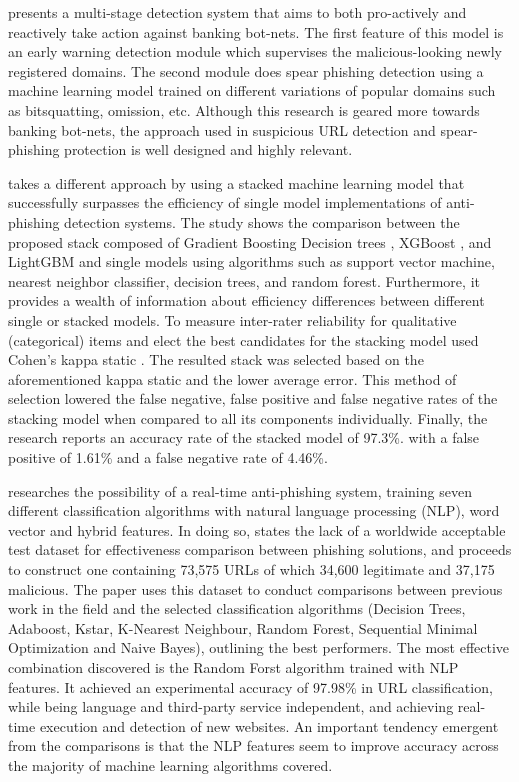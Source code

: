 \cite{MULTISTAGED_DETECTION_BOTNETS} presents a multi-stage detection system that aims to both pro-actively and reactively take action against banking bot-nets. The first feature of this model is an early warning detection module which supervises the malicious-looking newly registered domains. The second module does spear phishing detection using a machine learning model trained on different variations of popular domains such as bitsquatting, omission, etc. Although this research is geared more towards banking bot-nets, the approach used in suspicious URL detection and spear-phishing protection is well designed and highly relevant.

\cite{STACKED_ML_URL_HTML} takes a different approach by using a stacked machine learning model that successfully surpasses the efficiency of single model implementations of anti-phishing detection systems. The study shows the comparison between the proposed stack composed of Gradient Boosting Decision trees \citep{GBDT}, XGBoost \citep{XGBOOST}, and LightGBM \citep{LIGHTGBM} and single models using algorithms such as support vector machine, nearest neighbor classifier, decision trees, and random forest. Furthermore, it provides a wealth of information about efficiency differences between different single or stacked models. To measure inter-rater reliability for qualitative (categorical) items and elect the best candidates for the stacking model \cite{STACKED_ML_URL_HTML} used Cohen's kappa static \citep{DATA_MINING_T&T}. The resulted stack was selected based on the aforementioned kappa static and the lower average error. This method of selection lowered the false negative, false positive and false negative rates of the stacking model when compared to all its components individually. Finally, the research reports an accuracy rate of the stacked model of 97.3\%. with a false positive of 1.61\% and a false negative rate of 4.46\%.

\cite{ML_BASED_DETECTION_FROM_URL} researches the possibility of a real-time anti-phishing system, training seven different classification algorithms with natural language processing (NLP), word vector and hybrid features. In doing so, \cite{ML_BASED_DETECTION_FROM_URL} states the lack of a worldwide acceptable test dataset for effectiveness comparison between phishing solutions, and proceeds to construct one containing 73,575 URLs of which 34,600 legitimate and 37,175 malicious. The paper uses this dataset to conduct comparisons between previous work in the field and the selected classification algorithms (Decision Trees, Adaboost, Kstar, K-Nearest Neighbour, Random Forest, Sequential Minimal Optimization and Naive Bayes), outlining the best performers. The most effective combination discovered is the Random Forst algorithm trained with NLP features. It achieved an experimental accuracy of 97.98\% in URL classification, while being language and third-party service independent, and achieving real-time execution and detection of new websites. An important tendency emergent from the comparisons is that the NLP features seem to improve accuracy across the majority of machine learning algorithms covered.

